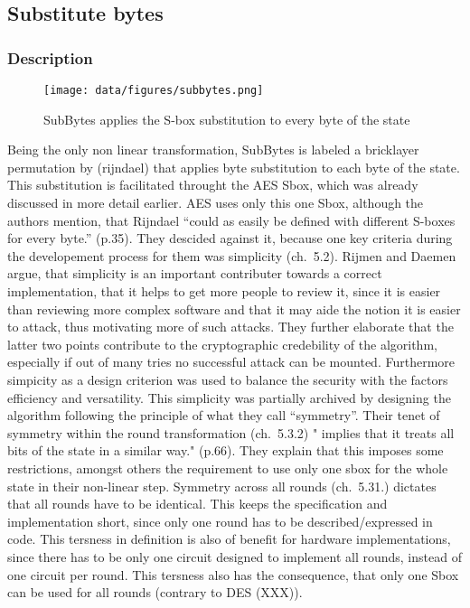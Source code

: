 \hypertarget{substitute-bytes}{%
\subsection{Substitute bytes}\label{substitute-bytes}}

\hypertarget{description-5}{%
\subsubsection{Description}\label{description-5}}

\begin{figure}
\centering
\texttt{[image: data/figures/subbytes.png]}
\caption{SubBytes applies the S-box substitution to every byte of the
state}
\end{figure}

Being the only non linear transformation, SubBytes is labeled a
bricklayer permutation by (rijndael) that applies byte substitution to
each byte of the state. This substitution is facilitated throught the
AES Sbox, which was already discussed in more detail earlier. AES uses
only this one Sbox, although the authors mention, that Rijndael ``could
as easily be defined with different S-boxes for every byte.'' (p.35).
They descided against it, because one key criteria during the
developement process for them was simplicity (ch.~5.2). Rijmen and
Daemen argue, that simplicity is an important contributer towards a
correct implementation, that it helps to get more people to review it,
since it is easier than reviewing more complex software and that it may
aide the notion it is easier to attack, thus motivating more of such
attacks. They further elaborate that the latter two points contribute to
the cryptographic credebility of the algorithm, especially if out of
many tries no successful attack can be mounted. Furthermore simpicity as
a design criterion was used to balance the security with the factors
efficiency and versatility. This simplicity was partially archived by
designing the algorithm following the principle of what they call
``symmetry''. Their tenet of symmetry within the round transformation
(ch.~5.3.2) " implies that it treats all bits of the state in a similar
way." (p.66). They explain that this imposes some restrictions, amongst
others the requirement to use only one sbox for the whole state in their
non-linear step. Symmetry across all rounds (ch.~5.31.) dictates that
all rounds have to be identical. This keeps the specification and
implementation short, since only one round has to be described/expressed
in code. This tersness in definition is also of benefit for hardware
implementations, since there has to be only one circuit designed to
implement all rounds, instead of one circuit per round. This tersness
also has the consequence, that only one Sbox can be used for all rounds
(contrary to DES (XXX)).

